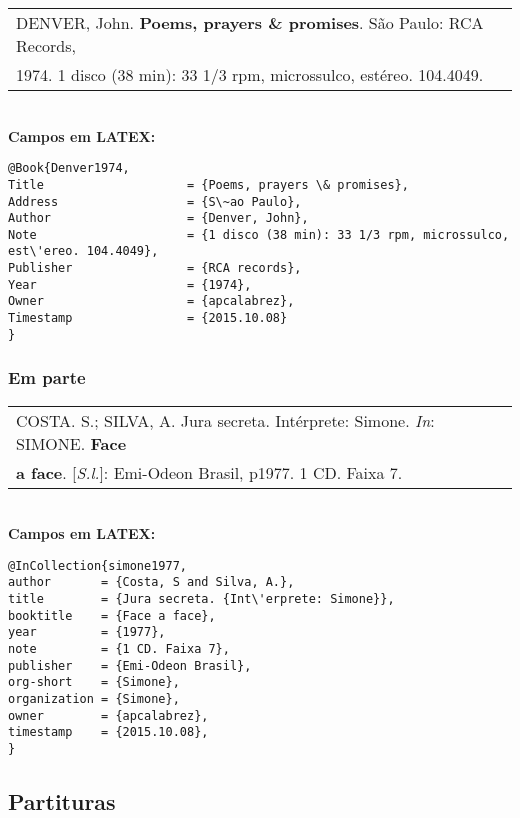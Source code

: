 \begin{tabular}{|l|c|} \hline
	DENVER, John. \textbf{Poems, prayers \& promises}. S\~ao Paulo: RCA Records,\\
	1974. 1 disco (38 min): 33 1/3 rpm, microssulco, est\'ereo. 104.4049. \\\hline
\end{tabular} \\

\textbf{Campos em LATEX:} 

\begin{verbatim}
@Book{Denver1974,
Title                    = {Poems, prayers \& promises},
Address                  = {S\~ao Paulo},
Author                   = {Denver, John},
Note                     = {1 disco (38 min): 33 1/3 rpm, microssulco, 
est\'ereo. 104.4049},
Publisher                = {RCA records},
Year                     = {1974},
Owner                    = {apcalabrez},
Timestamp                = {2015.10.08}
}
\end{verbatim}

\subsubsection{Em parte}

\begin{tabular}{|l|c|} \hline
	COSTA. S.; SILVA, A. Jura secreta. Int\'erprete: Simone. \textit{In}: SIMONE. \textbf{Face}\\ \textbf{a face}. [\textit{S.l.}]: Emi-Odeon Brasil, p1977. 1 CD. Faixa 7. 
	\\\hline
\end{tabular} \\

\textbf{Campos em LATEX:} 

\begin{verbatim}
@InCollection{simone1977,
author       = {Costa, S and Silva, A.},
title        = {Jura secreta. {Int\'erprete: Simone}},
booktitle    = {Face a face},
year         = {1977},
note         = {1 CD. Faixa 7},
publisher    = {Emi-Odeon Brasil},
org-short    = {Simone},
organization = {Simone},
owner        = {apcalabrez},
timestamp    = {2015.10.08},
}
\end{verbatim}

\subsection{Partituras}

